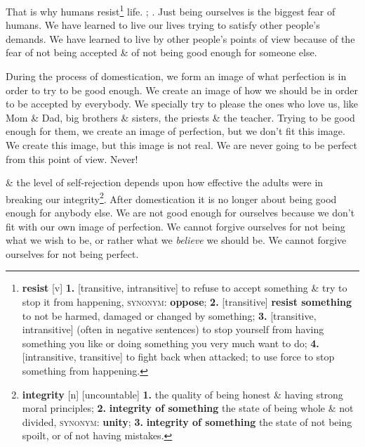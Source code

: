 \documentclass[oneside]{book}
\numberwithin{equation}{section}
\begin{document}
That is why humans resist\footnote{\textbf{resist} [v] \textbf{1.} [transitive, intransitive] to refuse to accept something \& try to stop it from happening, \textsc{synonym}: \textbf{oppose}; \textbf{2.} [transitive] \textbf{resist something} to not be harmed, damaged or changed by something; \textbf{3.} [transitive, intransitive] (often in negative sentences) to stop yourself from having something you like or doing something you very much want to do; \textbf{4.} [intransitive, transitive] to fight back when attacked; to use force to stop something from happening.} life.  ; . Just being ourselves is the biggest fear of humans. We have learned to live our lives trying to satisfy other people's demands. We have learned to live by other people's points of view because of the fear of not being accepted \& of not being good enough for someone else.

During the process of domestication, we form an image of what perfection is in order to try to be good enough. We create an image of how we should be in order to be accepted by everybody. We specially try to please the ones who love us, like Mom \& Dad, big brothers \& sisters, the priests \& the teacher. Trying to be good enough for them, we create an image of perfection, but we don't fit this image. We create this image, but this image is not real. We are never going to be perfect from this point of view. Never!

 \& the level of self-rejection depends upon how effective the adults were in breaking our integrity\footnote{\textbf{integrity} [n] [uncountable] \textbf{1.} the quality of being honest \& having strong moral principles; \textbf{2.} \textbf{integrity of something} the state of being whole \& not divided, \textsc{synonym}: \textbf{unity}; \textbf{3.} \textbf{integrity of something} the state of not being spoilt, or of not having mistakes.}. After domestication it is no longer about being good enough for anybody else. We are not good enough for ourselves because we don't fit with our own image of perfection. We cannot forgive ourselves for not being what we wish to be, or rather what we \textit{believe} we should be. We cannot forgive ourselves for not being perfect.
\end{document}
